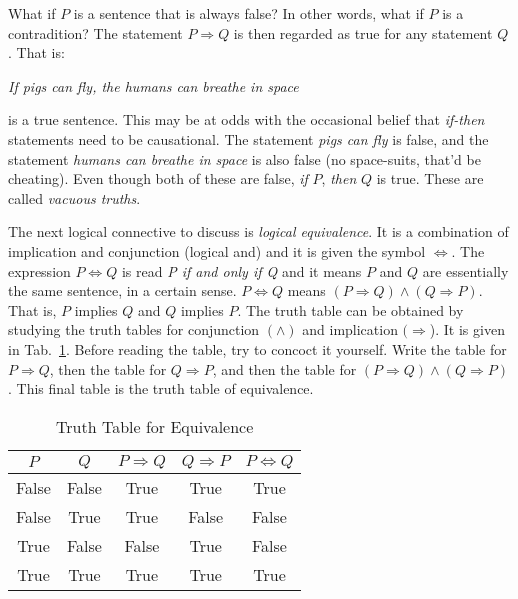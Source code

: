             \par\hfill\par
            What if $P$ is a sentence that is always false? In other words,
            what if $P$ is a contradition? The statement $P\Rightarrow{Q}$
            is then regarded as true for any statement $Q$. That is:
            \begin{center}
                \textit{If pigs can fly, the humans can breathe in space}
            \end{center}
            is a true sentence. This may be at odds with the occasional
            belief that \textit{if-then} statements need to be
            causational. The statement \textit{pigs can fly} is false,
            and the statement \textit{humans can breathe in space} is also
            false (no space-suits, that'd be cheating). Even though both of
            these are false, \textit{if} $P$, \textit{then} $Q$ is true.
            These are called \textit{vacuous truths}.
            \par\hfill\par
            The next logical connective to discuss is
            \textit{logical equivalence}. It is a combination of implication
            and conjunction (logical and) and it is given the symbol
            $\Leftrightarrow$. The expression $P\Leftrightarrow{Q}$ is read
            \textit{P if and only if Q} and it means $P$ and $Q$ are essentially
            the same sentence, in a certain sense. $P\Leftrightarrow{Q}$ means
            $(P\Rightarrow{Q})\land(Q\Rightarrow{P})$. That is,
            $P$ implies $Q$ and $Q$ implies $P$. The truth table can be obtained
            by studying the truth tables for conjunction $(\land)$ and
            implication $(\Rightarrow$). It is given in
            Tab.~\ref{tab:truth_table_equivalence}. Before reading the table,
            try to concoct it yourself. Write the table for $P\Rightarrow{Q}$,
            then the table for $Q\Rightarrow{P}$, and then the table for
            $(P\Rightarrow{Q})\land(Q\Rightarrow{P})$. This final table is the
            truth table of equivalence.
            \begin{table}[H]
                \centering
                \begin{tabular}{c | c | c | c | c}
                    $P$&$Q$&$P\Rightarrow{Q}$&
                        $Q\Rightarrow{P}$&$P\Leftrightarrow{Q}$\\
                    \hline
                    False&False&True&True&True\\
                    \hline
                    False&True&True&False&False\\
                    \hline
                    True&False&False&True&False\\
                    \hline
                    True&True&True&True&True
                \end{tabular}
                \caption{Truth Table for Equivalence}
                \label{tab:truth_table_equivalence}
            \end{table}
